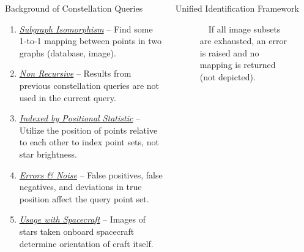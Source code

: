 \documentclass{beamer}
\newlength{\onecolwid}
\newlength{\twocolwid}
\begin{document}
\begin{frame}[t]
\begin{columns}[t]
\begin{column}{\onecolwid}
				\vspace*{0.5cm}
				\begin{block}{Background of Constellation Queries}
					\begin{enumerate}
						\setlength\itemsep{1cm}
						\item \parbox{0.95\linewidth}{
							\underline{\emph{Subgraph Isomorphism}} -- Find some 1-to-1 mapping between points in two graphs (database, image).
							}
						\item \parbox{0.95\linewidth}{
							\underline{\emph{Non Recursive}} -- Results from previous constellation queries are not used in the current query.
							}
						\item \parbox{0.95\linewidth}{
							\underline{\emph{Indexed by Positional Statistic}} -- Utilize the position of points relative to each other to index point sets, not star brightness.
							}
						\item \parbox{0.95\linewidth}{
							\underline{\emph{Errors \& Noise}} -- False positives, false negatives, and deviations in true position affect the query point set.
							}
						\item \parbox{0.95\linewidth}{
							\underline{\emph{Usage with Spacecraft}} -- Images of stars taken onboard spacecraft determine orientation of craft itself.
							}
					\end{enumerate}
				\end{block}
			\end{column}
			
			\begin{column}{\twocolwid}
				\begin{columns}[t,totalwidth=\twocolwid]
					\begin{column}{\onecolwid}\vspace{-.6in} %
						\begin{block}{Unified Identification Framework}
							\begin{figure}
								\centering
								
								\parbox{0.95\linewidth}{\caption{\ \
									If all image subsets are exhausted, an error is raised and no mapping is returned (not depicted).
								}}
							\end{figure}
						\end{block}
					\end{column}
					

\end{columns}
\end{column}
\end{columns}
\end{frame}
\end{document}
